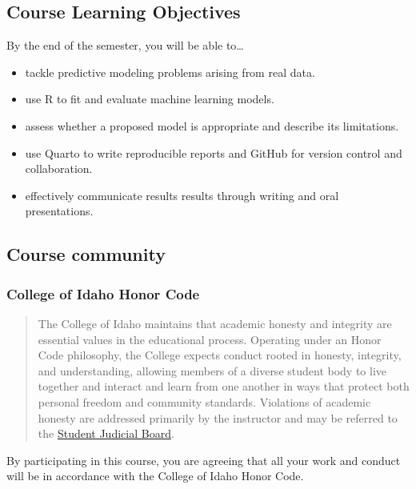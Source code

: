 \documentclass[
  letterpaper,
  DIV=11,
  numbers=noendperiod]{scrartcl}
\begin{document}
\subsection{Course Learning
Objectives}\label{course-learning-objectives}

By the end of the semester, you will be able to\ldots{}

\begin{itemize}
\item
  tackle predictive modeling problems arising from real data.
\item
  use R to fit and evaluate machine learning models.
\item
  assess whether a proposed model is appropriate and describe its
  limitations.
\item
  use Quarto to write reproducible reports and GitHub for version
  control and collaboration.
\item
  effectively communicate results results through writing and oral
  presentations.
\end{itemize}

\subsection{Course community}\label{course-community}

\subsubsection{College of Idaho Honor
Code}\label{college-of-idaho-honor-code}

\begin{quote}
The College of Idaho maintains that academic honesty and integrity are
essential values in the educational process. Operating under an Honor
Code philosophy, the College expects conduct rooted in honesty,
integrity, and understanding, allowing members of a diverse student body
to live together and interact and learn from one another in ways that
protect both personal freedom and community standards. Violations of
academic honesty are addressed primarily by the instructor and may be
referred to the
\href{https://collegeofidaho.smartcatalogiq.com/en/current/Undergraduate-Catalog/Policies-and-Procedures/Academic-Misconduct}{Student
Judicial Board}.
\end{quote}

By participating in this course, you are agreeing that all your work and
conduct will be in accordance with the College of Idaho Honor Code.
\end{document}
